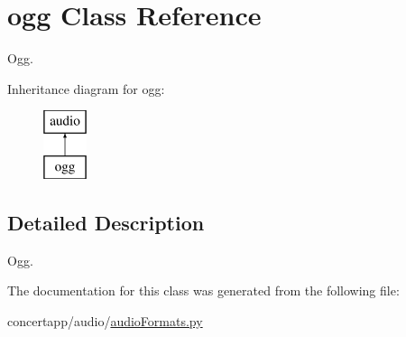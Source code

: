 \hypertarget{classogg}{
\section{ogg Class Reference}
\label{classogg}
}


Ogg.  


Inheritance diagram for ogg:\begin{figure}[H]
\begin{center}
\leavevmode
\includegraphics[height=2.000000cm]{classogg}
\end{center}
\end{figure}


\subsection{Detailed Description}
Ogg. 

The documentation for this class was generated from the following file:\begin{DoxyCompactItemize}
\item 
concertapp/audio/\hyperlink{audio_formats_8py}{audioFormats.py}\end{DoxyCompactItemize}
